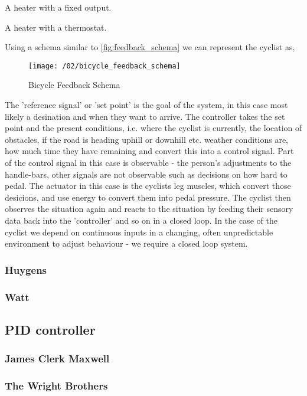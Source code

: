 A heater with a fixed output.

A heater with a thermostat.

Using a schema similar to \ref{fig:feedback_schema} we can represent the cyclist as,

\begin{figure}
\texttt{[image: /02/bicycle\_feedback\_schema]}
\caption{Bicycle Feedback Schema}
\label{fig:bicycle_feedback_schema}
\end{figure}

The 'reference signal' or 'set point' is the goal of the system, in this case most likely a
desination and when they want to arrive. The controller takes the set point and the present
conditions, i.e. where the cyclist is currently, the location of obstacles, if the road is heading
uphill or downhill etc.  weather conditions are, how much time they have remaining and convert this
into a control signal. Part of the control signal in this case is observable - the person's
adjustments to the handle-bars, other signals are not observable such as decisions on how hard to
pedal. The actuator in this case is the cyclists leg muscles, which convert those desicions, and use
energy to convert them into pedal pressure. The cyclist then observes the situation again and reacts
to the situation by feeding their sensory data back into the 'controller' and so on in a closed
loop. In the case of the cyclist we depend on continuous inputs in a changing, often unpredictable
environment to adjust behaviour - we require a closed loop system.

\subsubsection{Huygens}

\subsubsection{Watt}

\subsection{PID controller}

\subsubsection{James Clerk Maxwell}

\subsubsection{The Wright Brothers}

